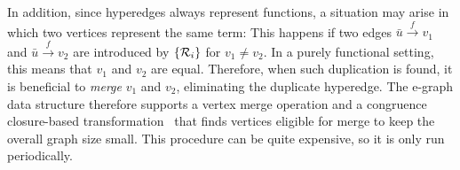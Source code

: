 In addition, since hyperedges always represent functions, a situation may arise
in which two vertices represent the same term:
This happens if two edges $\bar{u}\xrightarrow{\scriptscriptstyle f}v_1$ and $\bar{u}\xrightarrow{\scriptscriptstyle f}v_2$
are introduced by $\{\mathcal{R}_i\}$ for $v_1\neq v_2$.
In a purely functional setting, this means that $v_1$ and $v_2$ are equal.
Therefore, when such duplication is found,
it is beneficial to \emph{merge} $v_1$ and $v_2$, eliminating the duplicate hyperedge.
The e-graph data structure therefore supports a vertex merge operation and a congruence closure-based
transformation~\cite{egg}
that finds vertices eligible for merge to keep the overall graph size small.
This procedure can be quite expensive, so it is only run periodically.